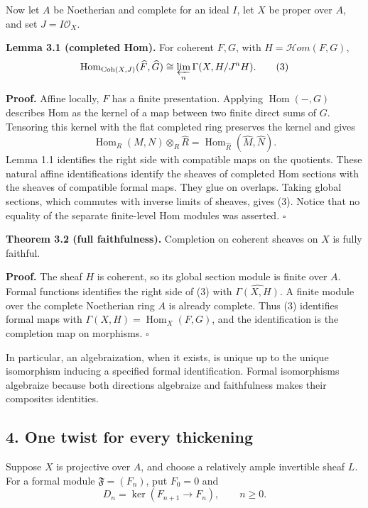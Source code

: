 \documentclass[11pt]{article}
\begin{document}
Now let \(A\) be Noetherian and complete for an ideal \(I\), let \(X\)
be proper over \(A\), and set \(J=I\mathcal O_X\).

\textbf{Lemma 3.1 (completed Hom).} For coherent \(F,G\), with
\(H=\mathcal Hom(F,G)\), \[
\operatorname{Hom}_{\operatorname{Coh}(X,J)}(\widehat F,\widehat G)
\cong\varprojlim_n\Gamma(X,H/J^nH).
\tag{3}
\]

\textbf{Proof.} Affine locally, \(F\) has a finite presentation.
Applying \(\operatorname{Hom}(-,G)\) describes Hom as the kernel of a
map between two finite direct sums of \(G\). Tensoring this kernel with
the flat completed ring preserves the kernel and gives \[
\operatorname{Hom}_R(M,N)\otimes_R\widehat R
=\operatorname{Hom}_{\widehat R}(\widehat M,\widehat N).
\] Lemma 1.1 identifies the right side with compatible maps on the
quotients. These natural affine identifications identify the sheaves of
completed Hom sections with the sheaves of compatible formal maps. They
glue on overlaps. Taking global sections, which commutes with inverse
limits of sheaves, gives (3). Notice that no equality of the separate
finite-level Hom modules was asserted. \(\square\)

\textbf{Theorem 3.2 (full faithfulness).} Completion on coherent sheaves
on \(X\) is fully faithful.

\textbf{Proof.} The sheaf \(H\) is coherent, so its global section
module is finite over \(A\). Formal functions identifies the right side
of (3) with \(\widehat{\Gamma(X,H)}\). A finite module over the complete
Noetherian ring \(A\) is already complete. Thus (3) identifies formal
maps with \(\Gamma(X,H)=\operatorname{Hom}_X(F,G)\), and the
identification is the completion map on morphisms. \(\square\)

In particular, an algebraization, when it exists, is unique up to the
unique isomorphism inducing a specified formal identification. Formal
isomorphisms algebraize because both directions algebraize and
faithfulness makes their composites identities.

\subsection{4. One twist for every
thickening}\label{one-twist-for-every-thickening}

Suppose \(X\) is projective over \(A\), and choose a relatively ample
invertible sheaf \(L\). For a formal module \(\mathfrak F=(F_n)\), put
\(F_0=0\) and \[
D_n=\ker(F_{n+1}\to F_n),\qquad n\geq0.
\]
\end{document}
